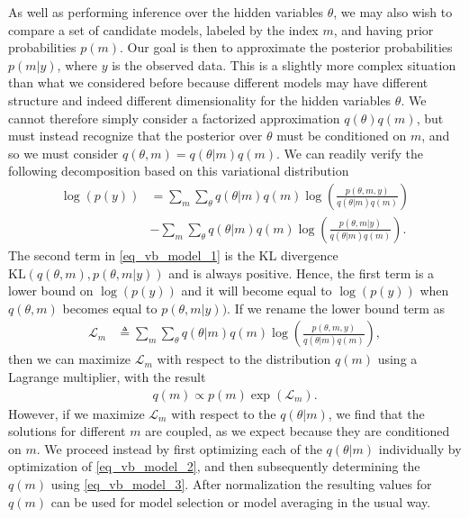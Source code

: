 \documentclass[10pt ]{article}
\begin{document}
As well as performing inference over the hidden variables $\theta$, we may also wish to compare a set of candidate models, labeled by the index $m$, and having prior probabilities $p(m)$. Our goal is then to approximate the posterior probabilities $p(m|y)$, where $y$ is the observed data. This is a slightly more complex situation than what we considered before because different models may have different structure and indeed different dimensionality for the hidden variables $\theta$. We cannot therefore simply consider a factorized approximation $q(\theta)q(m)$, but must instead recognize that the posterior over $\theta$ must be conditioned on $m$, and so we must consider $q(\theta, m) = q(\theta|m)q(m)$. We can readily verify the following decomposition based on this variational distribution
\begin{align}
\log \left( p (y) \right) &=  \sum_{m} \sum_{\theta} q(\theta | m) q(m) \log \left( \frac{p(\theta, m, y)}{q(\theta | m ) q(m)}\right) \nonumber \\
&-  \sum_{m} \sum_{\theta} q(\theta | m) q(m) \log \left( \frac{p(\theta, m | y)}{q(\theta | m ) q(m)}\right).
\label{eq_vb_model_1}
\end{align}
The second term in \eqref{eq_vb_model_1} is the KL divergence $\mathrm{KL} ( q(\theta , m ), p(\theta, m |y))$ and is always positive. Hence, the first term is a lower bound on $\log \left( p (y) \right)$ and it will become equal to $\log \left( p (y) \right)$ when $q(\theta , m )$ becomes equal to $p(\theta, m |y))$. If we rename the lower bound term as 
\begin{align}
\mathcal{L}_m &\triangleq  \sum_{m} \sum_{\theta} q(\theta | m) q(m) \log \left( \frac{p(\theta, m, y)}{q(\theta | m ) q(m)}\right), 
\label{eq_vb_model_2}
\end{align}
then we can maximize $\mathcal{L}_m$ with respect to the distribution $q(m)$ using a Lagrange multiplier, with the result
\begin{align}
q(m) \propto p(m) \exp (\mathcal{L}_m).
\label{eq_vb_model_3}
\end{align}
However, if we maximize $\mathcal{L}_m$  with respect to the $q(\theta|m)$, we find that the solutions for different $m$ are coupled, as we expect because they are conditioned on $m$. We proceed instead by first optimizing each of the $q(\theta|m)$ individually by optimization of \eqref{eq_vb_model_2}, and then subsequently determining the $q(m)$ using \eqref{eq_vb_model_3}. After normalization the resulting values for $q(m)$ can be used for model selection or model averaging in the usual way.
\end{document}

